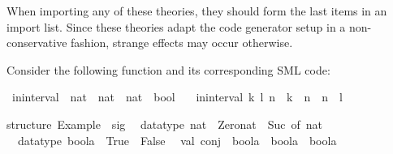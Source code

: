\begin{isabellebody}
\begin{isamarkuptext}
  \begin{warn}
    When importing any of these theories, they should form the last
    items in an import list.  Since these theories adapt the code
    generator setup in a non-conservative fashion, strange effects may
    occur otherwise.
  \end{warn}%
\end{isamarkuptext}%
\isamarkuptrue%
%
\isamarkuptrue%
%
\begin{isamarkuptext}%
Consider the following function and its corresponding SML code:%
\end{isamarkuptext}%
\isamarkuptrue%
%
\isadelimquote
%
\endisadelimquote
%
\isatagquote
{}\isamarkupfalse%
\ in{}interval\ {}{}\ {}nat\ {}\ nat\ {}\ nat\ {}\ bool{}\ \isanewline
\ \ {}in{}interval\ {}k{}\ l{}\ n\ {}\ k\ {}\ n\ {}\ n\ {}\ l{}%
\endisatagquote
{\isafoldquote}%
%
\isadelimquote
%
\endisadelimquote
%
\isadeliminvisible
%
\endisadeliminvisible
%
\isataginvisible
%
\endisataginvisible
{\isafoldinvisible}%
%
\isadeliminvisible
%
\endisadeliminvisible
%
\isadelimquotetypewriter
%
\endisadelimquotetypewriter
%
\isatagquotetypewriter
%
\begin{isamarkuptext}%
structure\ Example\ {}\ sig\isanewline
\ \ datatype\ nat\ {}\ Zero{}nat\ {}\ Suc\ of\ nat\isanewline
\ \ datatype\ boola\ {}\ True\ {}\ False\isanewline
\ \ val\ conj\ {}\ boola\ {}{}\ boola\ {}{}\ boola\isanewline

\end{isamarkuptext}
\end{isabellebody}
